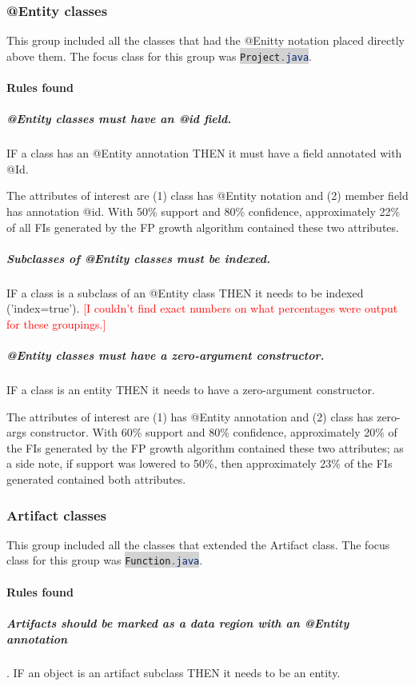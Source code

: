 \documentclass[12pt]{article}
\newcommand{\tcr}{\textcolor{red}}
\newcommand{\inlinecode}[2]{\colorbox{lightgray}{\lstinline[language=#1]$#2$}}
\begin{document}
		
	\subsubsection{@Entity classes}
		This group included all the classes that had the @Enitty notation placed directly above them. The focus class for this group was \inlinecode{Java}{Project.java}.
		\paragraph {Rules found}
		
		\subparagraph{@Entity classes must have an @id field.} IF a class has an @Entity annotation THEN it must have a field annotated with @Id. 
		
		The attributes of interest are (1) class has @Entity notation and (2) member field has annotation @id. With 50\% support and 80\% confidence, approximately 22\% of all FIs generated by the FP growth algorithm contained these two attributes.
		
		\subparagraph{Subclasses of @Entity classes must be indexed.} IF a class is a subclass of an @Entity class THEN it needs to be indexed ('index=true'). \tcr{[I couldn't find exact numbers on what percentages were output for these groupings.]}
		
		\subparagraph{@Entity classes must have a zero-argument constructor.} IF a class is an entity THEN it needs to have a zero-argument constructor.
		
		The attributes of interest are (1) has @Entity annotation and (2) class has zero-args constructor. With 60\% support and 80\% confidence, approximately 20\% of the FIs generated by the FP growth algorithm contained these two attributes; as a side note, if support was lowered to 50\%, then approximately 23\% of the FIs generated contained both attributes.



	\subsubsection{Artifact classes }
		This group included all the classes that extended the Artifact class. The focus class for this group was \inlinecode{Java}{Function.java}.  

		\paragraph {Rules found}
		
		\subparagraph{Artifacts should be marked as a data region with an @Entity annotation}.  IF an object is an artifact subclass THEN it needs to be an entity.
\end{document}
